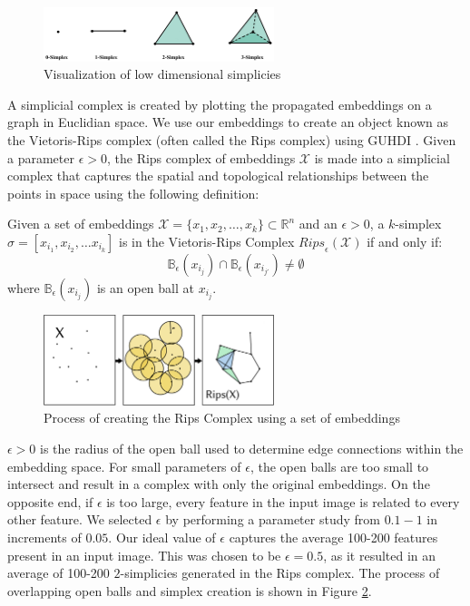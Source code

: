\begin{figure}[h]
    \centering
    \includegraphics[width=0.6\textwidth]{imgs/simplexMod.jpg}
    \caption{Visualization of low dimensional simplicies}
    \label{fig:simplex}
\end{figure}

A simplicial complex is created by plotting the propagated embeddings on a graph in Euclidian space. We use our embeddings to create an object known as the Vietoris-Rips complex (often called the Rips complex) using GUHDI \cite{gudhi:RipsComplex}. Given a parameter $\epsilon>0$, the Rips complex of embeddings $\mathcal{X}$ is made into a simplicial complex that captures the spatial and topological relationships between the points in space using the following definition: 

\begin{definition}
Given a set of embeddings $\mathcal{X} = \{x_1, x_2, \hdots, x_k\} \subset \mathbb{R}^{n}$ and an $\epsilon>0$, a $k$-simplex $\sigma = [x_{i_1}, x_{i_2}, \hdots x_{i_k}]$ is in the Vietoris-Rips Complex $\textit{Rips}_{\epsilon}(\mathcal{X})$ if and only if:
\[ \mathbb{B}_{\epsilon}(x_{i_j}) \cap \mathbb{B}_{\epsilon}(x_{i_{j'}}) \neq \emptyset \]
where $\mathbb{B}_{\epsilon}(x_{i_j})$ is an open ball at $x_{i_j}$.
\end{definition}

\begin{figure}[h]
    \centering
    \includegraphics[width=0.6\textwidth]{imgs/RipsMod.jpg}
    \caption{Process of creating the Rips Complex using a set of embeddings}
    \label{fig:Rips}
\end{figure}

$\epsilon>0$ is the radius of the open ball used to determine edge connections within the embedding space. For small parameters of $\epsilon$, the open balls are too small to intersect and result in a complex with only the original embeddings. On the opposite end, if $\epsilon$ is too large, every feature in the input image is related to every other feature. We selected $\epsilon$ by performing a parameter study from $0.1-1$ in increments of $0.05$. Our ideal value of $\epsilon$ captures the average 100-200 features present in an input image. This was chosen to be $\epsilon=0.5$, as it resulted in an average of 100-200 $2$-simplicies generated in the Rips complex. The process of overlapping open balls and simplex creation is shown in Figure \ref{fig:Rips}. 

